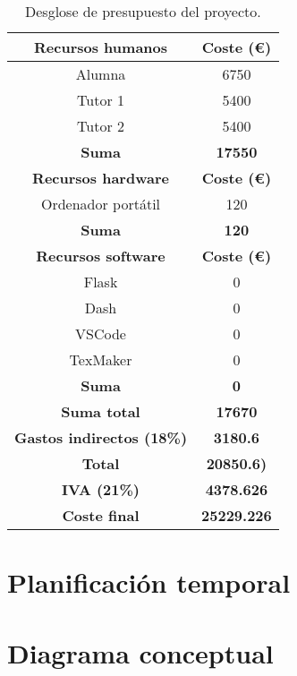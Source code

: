 \begin{table}[!h]
\caption{Desglose de presupuesto del proyecto.}
\begin{center}
\begin{tabular}{|c c|} 
 \hline
 \textbf{Recursos humanos} & \textbf{Coste (€)} \\ 
 \hline\hline
 Alumna & 6750 \\
 \hline
 Tutor 1 & 5400 \\
 \hline 
 Tutor 2 & 5400 \\
 \textbf{Suma} & \textbf{17550} \\
 \hline
 \textbf{Recursos hardware} & \textbf{Coste (€)} \\ 
 \hline\hline
 Ordenador portátil & 120 \\
 \hline
 \textbf{Suma} & \textbf{120} \\
 \hline 
 \textbf{Recursos software} & \textbf{Coste (€)} \\
 \hline
  Flask & 0 \\
  \hline
  Dash & 0 \\
  \hline 
  VSCode & 0 \\
  \hline
  TexMaker & 0 \\
  \hline 
  \textbf{Suma} & \textbf{0} \\ 
 \hline\hline
 \textbf{Suma total} & \textbf{17670} \\
 \hline\hline
 \textbf{Gastos indirectos (18\%)} & \textbf{3180.6} \\ 
 \hline\hline
 \textbf{Total} & \textbf{20850.6)} \\ 
 \hline\hline
 \textbf{IVA (21\%)} & \textbf{4378.626} \\ 
 \hline\hline
 \textbf{Coste final} & \textbf{25229.226} \\ 
 \hline\hline

 \hline
\end{tabular}
\label{tabla_pres}
\end{center}
\end{table}

\section{Planificación temporal}



\section{Diagrama conceptual}

